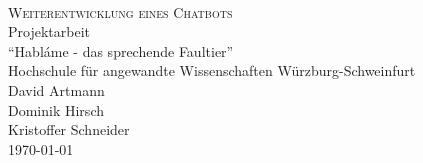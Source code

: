 \begin{titlepage}
   	\mbox{}\vspace{5\baselineskip}\\
   	\rmfamily\huge
   	\centering
	\textsc{Weiterentwicklung eines Chatbots}
	\\[3ex]
   	Projektarbeit
   	\\[1ex]
   	\rmfamily\Large
   	"`Habláme - das sprechende Faultier"'
   	\vspace{1\baselineskip}\\
	\vspace{3\baselineskip}
	Hochschule für angewandte Wissenschaften Würzburg-Schweinfurt
   	\vspace{5\baselineskip}\\
   	\rmfamily\Large
   	David Artmann\\
   	\rmfamily\Large
   	Dominik Hirsch\\
   	\rmfamily\Large
   	Kristoffer Schneider
   	\vspace{1\baselineskip}\\
   	\today
\end{titlepage}